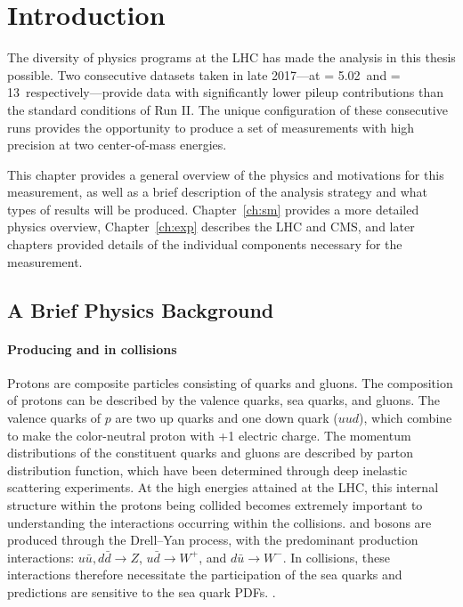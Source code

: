\chapter{Introduction}

The diversity of physics programs at the LHC has made the analysis  in this thesis possible. Two consecutive datasets taken in late 2017---at \s = 5.02~\TeV and \s = 13~\TeV respectively---provide data with significantly lower pileup contributions than the standard conditions of Run II.  The unique configuration of these consecutive runs provides the opportunity to produce a set of measurements with high precision at two center-of-mass energies. 

This chapter provides a general overview of the physics and motivations for this measurement, as well as a brief description of the analysis strategy and what types of results will be produced. Chapter~\ref{ch:sm} provides a more detailed physics overview, Chapter~\ref{ch:exp} describes the LHC and CMS, and later chapters provided details of the individual components necessary for the measurement.


\section{A Brief Physics Background}

\subsubsection{Producing \W and \Z in \pp collisions}
Protons are composite particles consisting of quarks and gluons. The composition of protons can be described by the valence quarks, sea quarks, and gluons. The valence quarks of $p$ are two up quarks and one down quark ($uud$), which combine to make the color-neutral proton with +1 electric charge. The momentum distributions of the constituent quarks and gluons are described by parton distribution function, which have been determined through deep inelastic scattering experiments. At the high energies attained at the LHC, this internal structure within the protons being collided becomes extremely important to understanding the interactions occurring within the \pp collisions. \W and \Z bosons are produced through the Drell--Yan process, with the predominant production interactions: $u\bar{u}, d\bar{d}\rightarrow Z$,  $u\bar{d}\rightarrow W^+$,  and $d\bar{u}\rightarrow W^-$. In \pp collisions, these interactions therefore necessitate the participation of the sea quarks and predictions are sensitive to the sea quark PDFs. .

